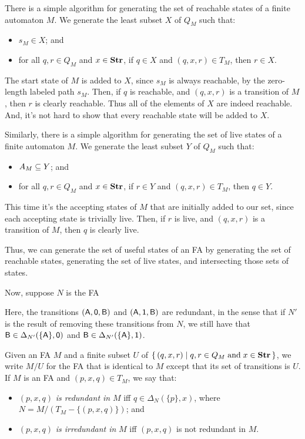 There is a simple algorithm for generating the set of reachable states
of a finite automaton $M$.  We generate the least subset $X$ of $Q_M$
such that:
\begin{itemize}
\item $s_M\in X$; and

\item for all $q,r\in Q_M$ and $x\in\mathbf{Str}$, if $q\in X$ and
$(q,x,r)\in T_M$, then $r\in X$.
\end{itemize}
The start state of $M$ is added to $X$, since $s_M$ is always
reachable, by the zero-length labeled path $s_M$.  Then, if $q$ is
reachable, and $(q,x,r)$ is a transition of $M$, then $r$ is clearly
reachable.  Thus all of the elements of $X$ are indeed reachable.
And, it's not hard to show that every reachable state will be added to
$X$.

Similarly, there is a simple algorithm for generating the
set of live states of a finite automaton $M$.  We generate the least
subset $Y$ of $Q_M$ such that:
\begin{itemize}
\item $A_M\subseteq Y$; and

\item for all $q,r\in Q_M$ and $x\in\mathbf{Str}$, if $r\in Y$ and
$(q,x,r)\in T_M$, then $q\in Y$.
\end{itemize}
This time it's the accepting states of $M$ that are initially added
to our set, since each accepting state is trivially live.
Then, if $r$ is live, and $(q,x,r)$ is a transition
of $M$, then $q$ is clearly live.

Thus, we can generate the set of useful states of an FA by generating
the set of reachable states, generating the set of live states, and
intersecting those sets of states.

Now, suppose $N$ is the FA
\begin{center}
  
\end{center}
Here, the transitions $(\mathsf{A},\mathsf{0},\mathsf{B})$ and $(\mathsf{A},\mathsf{1},\mathsf{B})$
are redundant, in the sense that if $N'$ is the result of removing these
transitions from $N$, we still have that $\mathsf{B}\in\Delta_{N'}(\{\mathsf{A}\},\mathsf{0})$
and $\mathsf{B}\in\Delta_{N'}(\{\mathsf{A}\},\mathsf{1})$.

Given an FA $M$ and a finite subset $U$ of $\{ \, (q,x,r) \mid q,r\in
  Q_M\;\allowbreak\mbox{and}\allowbreak\; x\in\mathbf{Str} \, \}$, we write $M/U$ for the FA that is
identical to $M$ except that its set of transitions is $U$.  If $M$ is
an FA and $(p,x,q)\in T_M$, we say that:
\begin{itemize}
\item $(p,x,q)$ \emph{is redundant in} $M$ iff
  $q\in\Delta_{N}(\{p\},x)$, where $N=M/(T_M-\{(p,x,q)\})$; and

\item $(p,x,q)$ \emph{is irredundant in} $M$ iff $(p,x,q)$ is not
  redundant in $M$.
\end{itemize}

